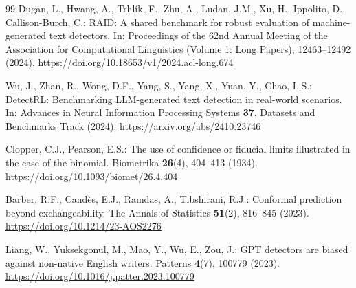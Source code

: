 \documentclass[pdflatex,sn-mathphys-num]{sn-jnl}
\begin{document}
\begin{thebibliography}{99}
Dugan, L., Hwang, A., Trhl\'ik, F., Zhu, A., Ludan, J.M., Xu, H., Ippolito, D., Callison-Burch, C.:
RAID: A shared benchmark for robust evaluation of machine-generated text detectors.
In: Proceedings of the 62nd Annual Meeting of the Association for Computational Linguistics (Volume 1: Long Papers), 12463--12492 (2024).
\url{https://doi.org/10.18653/v1/2024.acl-long.674}

Wu, J., Zhan, R., Wong, D.F., Yang, S., Yang, X., Yuan, Y., Chao, L.S.:
DetectRL: Benchmarking LLM-generated text detection in real-world scenarios.
In: Advances in Neural Information Processing Systems \textbf{37}, Datasets and Benchmarks Track (2024).
\url{https://arxiv.org/abs/2410.23746}

Clopper, C.J., Pearson, E.S.:
The use of confidence or fiducial limits illustrated in the case of the binomial.
Biometrika \textbf{26}(4), 404--413 (1934).
\url{https://doi.org/10.1093/biomet/26.4.404}

Barber, R.F., Cand\`es, E.J., Ramdas, A., Tibshirani, R.J.:
Conformal prediction beyond exchangeability.
The Annals of Statistics \textbf{51}(2), 816--845 (2023).
\url{https://doi.org/10.1214/23-AOS2276}

Liang, W., Yuksekgonul, M., Mao, Y., Wu, E., Zou, J.:
GPT detectors are biased against non-native English writers.
Patterns \textbf{4}(7), 100779 (2023).
\url{https://doi.org/10.1016/j.patter.2023.100779}

\end{thebibliography}
\end{document}
